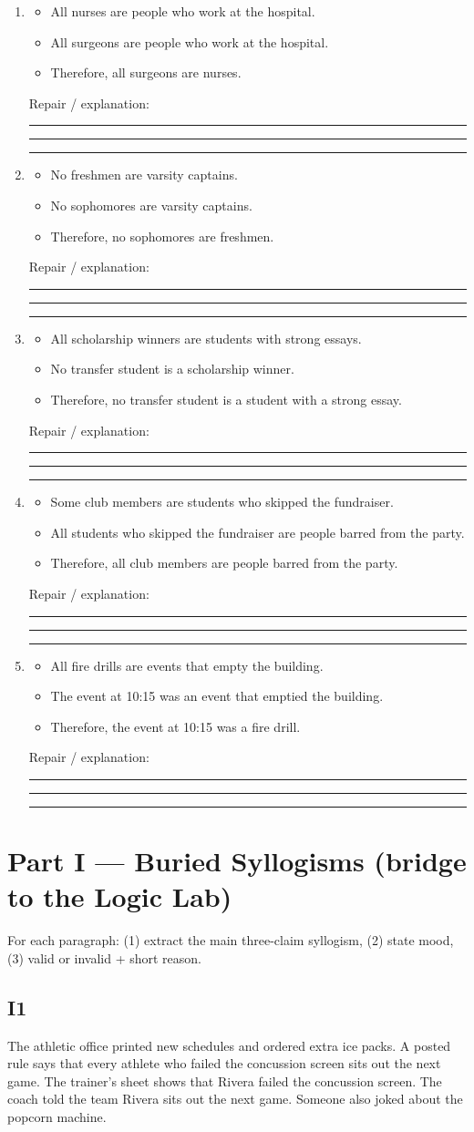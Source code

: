 \documentclass[11pt]{article}
\newcommand{\ansline}{\par\vspace{0.15em}\noindent\rule{\linewidth}{0.4pt}\par\vspace{0.08em}}
\newcommand{\threelines}{\ansline\ansline\ansline}
\newcommand{\syllblock}[3]{%
\begin{itemize}[leftmargin=1.2em]
\item #1
\item #2
\item #3
\end{itemize}
}
\begin{document}
\begin{enumerate}
\item
\syllblock
{All nurses are people who work at the hospital.}
{All surgeons are people who work at the hospital.}
{Therefore, all surgeons are nurses.}
Repair / explanation:\\
\threelines

\item
\syllblock
{No freshmen are varsity captains.}
{No sophomores are varsity captains.}
{Therefore, no sophomores are freshmen.}
Repair / explanation:\\
\threelines

\item
\syllblock
{All scholarship winners are students with strong essays.}
{No transfer student is a scholarship winner.}
{Therefore, no transfer student is a student with a strong essay.}
Repair / explanation:\\
\threelines

\item
\syllblock
{Some club members are students who skipped the fundraiser.}
{All students who skipped the fundraiser are people barred from the party.}
{Therefore, all club members are people barred from the party.}
Repair / explanation:\\
\threelines

\item
\syllblock
{All fire drills are events that empty the building.}
{The event at 10:15 was an event that emptied the building.}
{Therefore, the event at 10:15 was a fire drill.}
Repair / explanation:\\
\threelines
\end{enumerate}

\section*{Part I --- Buried Syllogisms (bridge to the Logic Lab)}
\noindent For each paragraph: (1) extract the main three-claim syllogism, (2) state mood, (3) valid or invalid + short reason.

\subsection*{I1}
The athletic office printed new schedules and ordered extra ice packs. A posted rule says that every athlete who failed the concussion screen sits out the next game. The trainer's sheet shows that Rivera failed the concussion screen. The coach told the team Rivera sits out the next game. Someone also joked about the popcorn machine.
\end{document}
